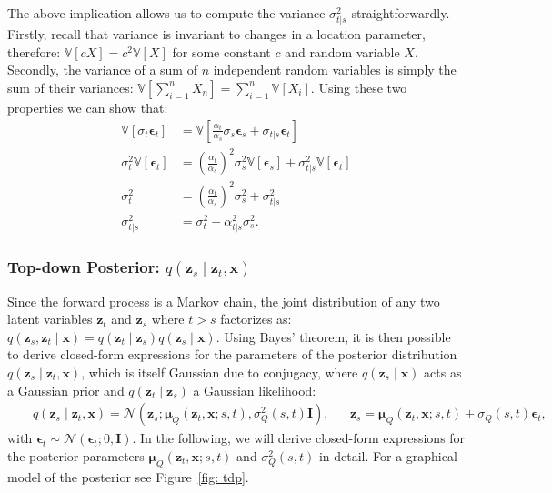 The above implication allows us to compute the variance $\sigma_{t|s}^2$ straightforwardly. Firstly, recall that variance is invariant to changes in a location parameter, therefore: $\mathbb{V}\left[ cX \right] = c^2\mathbb{V}\left[ X \right]$ for some constant $c$ and random variable $X$. Secondly, the variance of a sum of $n$ independent random variables is simply the sum of their variances: $\mathbb{V}\left[\sum_{i=1}^n X_n\right] = \sum_{i=1}^n\mathbb{V}\left[ X_i\right]$. Using these two properties we can show that:
%
\begin{align}
    \mathbb{V}\left[\sigma_t \boldsymbol{\epsilon}_t\right] & = \mathbb{V}\left[\frac{\alpha_t}{\alpha_s} \sigma_s \boldsymbol{\epsilon}_s + \sigma_{t|s}\boldsymbol{\epsilon}_{t}\right]
    \\[5pt] \sigma^2_t\mathbb{V}\left[ \boldsymbol{\epsilon}_t\right] & = \left(\frac{\alpha_t}{\alpha_s}\right)^2 \sigma_s^2\mathbb{V}\left[ \boldsymbol{\epsilon}_s\right] + \sigma_{t|s}^2 \mathbb{V}\left[\boldsymbol{\epsilon}_{t}\right]
    \\[5pt] \sigma^2_t & = \left(\frac{\alpha_t}{\alpha_s}\right)^2 \sigma_s^2 + \sigma_{t|s}^2
    \\[5pt] \sigma_{t|s}^2 & = \sigma^2_t - \alpha_{t|s}^2 \sigma_s^2. \label{eq: post_var}
\end{align}
%
\subsubsection{Top-down Posterior: $q(\mathbf{z}_s \mid \mathbf{z}_{t}, \mathbf{x})$}
\label{subsubsec: qzs}
Since the forward process is a Markov chain, the joint distribution of any two latent variables $\mathbf{z}_t$ and $\mathbf{z}_s$ where $t > s$ factorizes as: $q(\mathbf{z}_s, \mathbf{z}_t \mid \mathbf{x}) =
q(\mathbf{z}_t \mid \mathbf{z}_s)q(\mathbf{z}_s \mid \mathbf{x})$. Using Bayes' theorem, it is then possible to derive closed-form expressions for the parameters of the posterior distribution $q(\mathbf{z}_s \mid \mathbf{z}_{t}, \mathbf{x})$, which is itself Gaussian due to conjugacy, where $q(\mathbf{z}_s \mid \mathbf{x})$ acts as a Gaussian prior and $q(\mathbf{z}_t \mid \mathbf{z}_s)$ a Gaussian likelihood:
%
\begin{align}
    &&q(\mathbf{z}_s \mid \mathbf{z}_{t}, \mathbf{x}) = \mathcal{N} \left(\mathbf{z}_s;\boldsymbol{\mu}_Q(\mathbf{z}_t, \mathbf{x}; s, t), \sigma^2_Q(s,t) \mathbf{I}\right), && \mathbf{z}_s = \boldsymbol{\mu}_Q(\mathbf{z}_t, \mathbf{x}; s, t) + \sigma_{Q}(s,t)\boldsymbol{\epsilon}_t, &&
\end{align}
%
with $\boldsymbol{\epsilon}_t \sim \mathcal{N}\left(\boldsymbol{\epsilon}_t; 0, \mathbf{I}\right)$. In the following, we will derive closed-form expressions for the posterior parameters $\boldsymbol{\mu}_Q(\mathbf{z}_t, \mathbf{x}; s, t)$ and $\sigma^2_Q(s,t)$ in detail. For a graphical model of the posterior see Figure~\ref{fig: tdp}.

